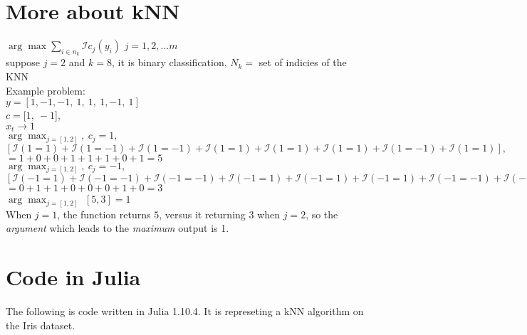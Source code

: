 \section{More about kNN \cite{guo2003knn}}

$\arg\max\sum_{i \in n_k}^{}\mathcal{I}c_j(y_i)$ $j={1,2,...m}$ \\
suppose $j=2$ and $k=8$, it is binary classification, $N_k=$ set of indicies of the KNN \\

Example problem: \\
$y=[1,-1,-1, \ 1, \ 1, \ 1,-1, \ 1]$ \\
$c = [1, \ -1$], \\
$x_t \rightarrow 1$ \\
$\arg\max_{j=[1,2]}, \ c_j=1, $ \\$[\mathcal{I}(1=1)+\mathcal{I}(1=-1)+\mathcal{I}(1=-1)+\mathcal{I}(1=1)+\mathcal{I}(1=1)+\mathcal{I}(1=1)+\mathcal{I}(1=-1)+\mathcal{I}(1=1)],$ \\
$= 1+0+0+1+1+1+0+1 = 5$\\
$\arg\max_{j=[1,2]}, \ c_j=-1, $ \\
$[\mathcal{I}(-1=1)+\mathcal{I}(-1=-1)+\mathcal{I}(-1=-1)+\mathcal{I}(-1=1)+\mathcal{I}(-1=1)+\mathcal{I}(-1=1)+\mathcal{I}(-1=-1)+\mathcal{I}(-1=1)]$ \\
$= 0+1+1+0+0+0+1+0 = 3$\\
$\arg\max_{j=[1,2]}$ $[5,3]=1$ \\
When $j = 1$, the function returns $5$, versus it returning $3$ when $j = 2$,
so the \textit{argument} which leads to the \textit{maximum} output is
1.


\section{Code in Julia}
The following is code written in Julia 1.10.4. 
It is represeting a kNN algorithm on the Iris dataset.


